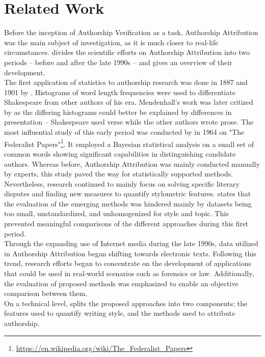 \chapter{Related Work}\label{related_work}
Before the inception of Authorship Verification as a task, Authorship Attribution was the main subject of investigation, as it is much closer to real-life circumstances.
\cite{stamatatos2009survey} divides the scientific efforts on Authorship Attribution into two periods -- before and after the late 1990s -- and gives an overview of their development.\\
The first application of statistics to authorship research was done in 1887 and 1901 by \citeauthor{mendenhall1887characteristic}.
Histograms of word length frequencies were used to differentiate Shakespeare from other authors of his era.
Mendenhall's work was later critized by \cite{williams1975mendenhall} as the differing histograms could better be explained by differences in presentation -- Shakespeare used verse while the other authors wrote prose.
The most influential study of this early period was conducted by \citeauthor{mosteller1964inference} in 1964 on "The Federalist Papers"\footnote{\url{https://en.wikipedia.org/wiki/The_Federalist_Papers}}.
It employed a Bayesian statistical analysis on a small set of common words showing significant capabilities in distinguishing candidate authors.
Whereas before, Authorship Attribution was mainly conducted manually by experts, this study paved the way for statistically supported methods.
Nevertheless, research continued to mainly focus on solving specific literary disputes and finding new measures to quantify stylometric features.
\citeauthor{stamatatos2009survey} states that the evaluation of the emerging methods was hindered mainly by datasets being too small, unstandardized, and unhomogenized for style and topic.
This prevented meaningful comparisons of the different approaches during this first period.\\
Through the expanding use of Internet media during the late 1990s, data utilized in Authorship Attribution began shifting towards electronic texts.
Following this trend, research efforts began to concentrate on the development of applications that could be used in real-world scenarios such as forensics or law.
Additionally, the evaluation of proposed methods was emphasized to enable an objective comparison between them.\\
On a technical level, \citeauthor{stamatatos2009survey} splits the proposed approaches into two components: the features used to quantify writing style, and the methods used to attribute authorship.
